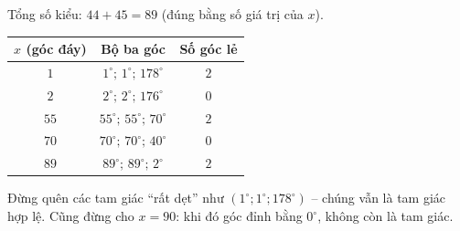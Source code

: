 {
Tổng số kiểu: $44+45=89$ (đúng bằng số giá trị của $x$).
\begin{center}\small
\begin{tabular}{|c|c|c|}
\hline
\rowcolor{tmBlue!10}$x$ (góc đáy) & Bộ ba góc & Số góc lẻ\\ \hline
$1$ & $1^\circ;\,1^\circ;\,178^\circ$ & $2$\\ \hline
$2$ & $2^\circ;\,2^\circ;\,176^\circ$ & $0$\\ \hline
$55$ & $55^\circ;\,55^\circ;\,70^\circ$ & $2$\\ \hline
$70$ & $70^\circ;\,70^\circ;\,40^\circ$ & $0$\\ \hline
$89$ & $89^\circ;\,89^\circ;\,2^\circ$ & $2$\\ \hline
\end{tabular}
\end{center}
\begin{warnbox}Đừng quên các tam giác ``rất dẹt'' như $(1^\circ;1^\circ;178^\circ)$ -- chúng vẫn là tam giác hợp lệ. Cũng đừng cho $x=90$: khi đó góc đỉnh bằng $0^\circ$, không còn là tam giác.\end{warnbox}
}

